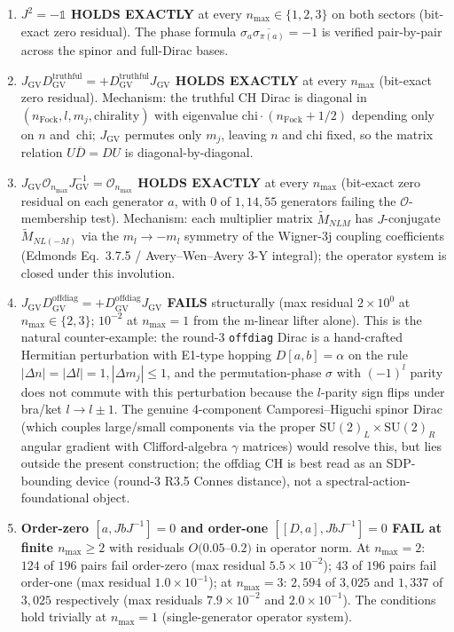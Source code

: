 \documentclass[11pt]{article}
\begin{document}
\begin{enumerate}
\item \textbf{$J^2 = -\mathbb{1}$ HOLDS EXACTLY} at every
$n_{\max} \in \{1, 2, 3\}$ on both sectors (bit-exact zero
residual).  The phase formula
$\sigma_a \overline{\sigma_{\pi(a)}} = -1$ is verified pair-by-pair
across the spinor and full-Dirac bases.
\item \textbf{$J_{\mathrm{GV}} D_{\mathrm{GV}}^{\mathrm{truthful}}
= +D_{\mathrm{GV}}^{\mathrm{truthful}} J_{\mathrm{GV}}$ HOLDS
EXACTLY} at every $n_{\max}$ (bit-exact zero residual).  Mechanism:
the truthful CH Dirac is diagonal in
$(n_{\mathrm{Fock}}, l, m_j, \mathrm{chirality})$ with eigenvalue
$\mathrm{chi} \cdot (n_{\mathrm{Fock}} + 1/2)$ depending only on $n$
and~$\mathrm{chi}$; $J_{\mathrm{GV}}$ permutes only $m_j$, leaving
$n$ and $\mathrm{chi}$ fixed, so the matrix relation
$U \overline{D} = D U$ is diagonal-by-diagonal.
\item \textbf{$J_{\mathrm{GV}} \mathcal{O}_{n_{\max}}
J_{\mathrm{GV}}^{-1} = \mathcal{O}_{n_{\max}}$ HOLDS EXACTLY} at
every $n_{\max}$ (bit-exact zero residual on each generator $a$, with
$0$ of $1, 14, 55$ generators failing the $\mathcal{O}$-membership
test).  Mechanism: each multiplier matrix
$\widetilde{M}_{NLM}$ has $J$-conjugate
$\widetilde{M}_{N L (-M)}$ via the $m_l \to -m_l$ symmetry of the
Wigner-3j coupling coefficients (Edmonds Eq.~3.7.5 / Avery--Wen--Avery
3-Y integral); the operator system is closed under this involution.
\item \textbf{$J_{\mathrm{GV}} D_{\mathrm{GV}}^{\mathrm{offdiag}}
= +D_{\mathrm{GV}}^{\mathrm{offdiag}} J_{\mathrm{GV}}$ FAILS}
structurally (max residual $2 \times 10^0$ at $n_{\max} \in \{2, 3\}$;
$10^{-2}$ at $n_{\max} = 1$ from the m-linear lifter alone).  This is
the natural counter-example: the round-3 \texttt{offdiag} Dirac is a
hand-crafted Hermitian perturbation with E1-type hopping
$D[a, b] = \alpha$ on the rule
$|\Delta n| = |\Delta l| = 1, |\Delta m_j| \le 1$, and the
permutation-phase $\sigma$ with $(-1)^l$ parity does not commute with
this perturbation because the $l$-parity sign flips under bra/ket
$l \to l \pm 1$.  The genuine 4-component Camporesi--Higuchi spinor
Dirac (which couples large/small components via the proper
$\mathrm{SU}(2)_L \times \mathrm{SU}(2)_R$ angular gradient with
Clifford-algebra $\gamma$ matrices) would resolve this, but lies
outside the present construction; the offdiag CH is best read as an
SDP-bounding device (round-3 R3.5 Connes distance), not a
spectral-action-foundational object.
\item \textbf{Order-zero $[a, J b J^{-1}] = 0$ and order-one
$[[D, a], J b J^{-1}] = 0$ FAIL at finite $n_{\max} \ge 2$} with
residuals $O(0.05$--$0.2)$ in operator norm.  At $n_{\max} = 2$:
$124$ of $196$ pairs fail order-zero (max residual $5.5\times 10^{-2}$);
$43$ of $196$ pairs fail order-one (max residual $1.0 \times 10^{-1}$);
at $n_{\max} = 3$: $2{,}594$ of $3{,}025$ and $1{,}337$ of $3{,}025$
respectively (max residuals $7.9 \times 10^{-2}$ and
$2.0 \times 10^{-1}$).  The conditions hold trivially at
$n_{\max} = 1$ (single-generator operator system).
\end{enumerate}
\end{document}
